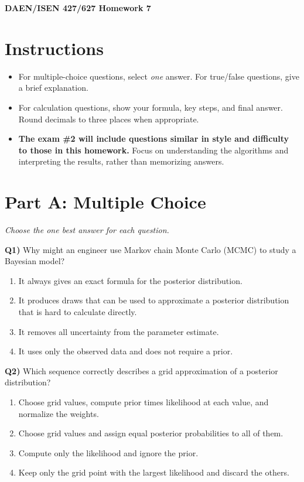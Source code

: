\documentclass[12pt]{article}
\newcommand{\question}[2]{\vspace{0.7em}\noindent\textbf{Q#1)}}
\begin{document}
\begin{center}
{\Large\bfseries DAEN/ISEN 427/627 Homework 7}
\par
\end{center}

\section*{Instructions}
\begin{itemize}[leftmargin=1.4em,nosep]
\item For multiple-choice questions, select \emph{one} answer. For true/false questions, give a brief explanation.
\item For calculation questions, show your formula, key steps, and final answer. Round decimals to three places when appropriate.
\item \textbf{The exam \#2 will include questions similar in style and difficulty to those in this homework.} Focus on understanding the algorithms and interpreting the results, rather than memorizing answers.
\end{itemize}

\section*{Part A: Multiple Choice}
\textit{Choose the one best answer for each question.}

\question{1}{}
Why might an engineer use Markov chain Monte Carlo (MCMC) to study a Bayesian model?
\begin{enumerate}[label=\Alph*.]
\item It always gives an exact formula for the posterior distribution.
\item It produces draws that can be used to approximate a posterior distribution that is hard to calculate directly.
\item It removes all uncertainty from the parameter estimate.
\item It uses only the observed data and does not require a prior.
\end{enumerate}

\question{2}{}
Which sequence correctly describes a grid approximation of a posterior distribution?
\begin{enumerate}[label=\Alph*.]
\item Choose grid values, compute prior times likelihood at each value, and normalize the weights.
\item Choose grid values and assign equal posterior probabilities to all of them.
\item Compute only the likelihood and ignore the prior.
\item Keep only the grid point with the largest likelihood and discard the others.
\end{enumerate}
\end{document}
